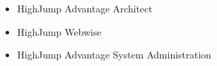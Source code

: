 \descriptionstyle
{
\begin{itemize}[leftmargin=2ex, nosep, noitemsep]
\item {HighJump Advantage Architect}
\item {HighJump Webwise}
\item {HighJump Advantage System Administration}
\end{itemize}
}